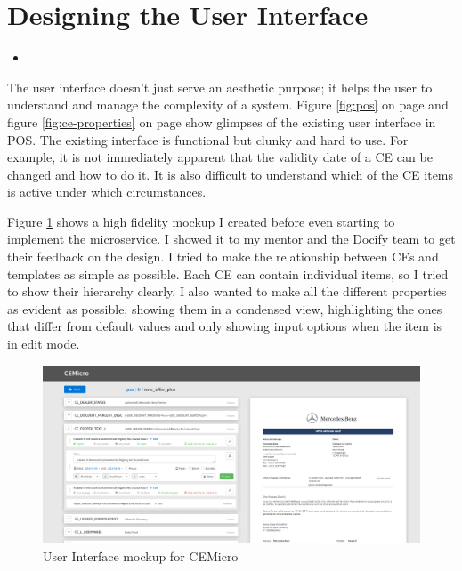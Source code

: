 \section{Designing the User Interface}

\begin{itemize}
  \item {}
\end{itemize}

The user interface doesn't just serve an aesthetic purpose; it helps the user to understand and manage the complexity of a system. Figure \ref{fig:pos} on page \pageref{fig:pos} and figure \ref{fig:ce-properties} on page \pageref{fig:ce-properties} show glimpses of the existing user interface in POS. The existing interface is functional but clunky and hard to use. For example, it is not immediately apparent that the validity date of a CE can be changed and how to do it. It is also difficult to understand which of the CE items is active under which circumstances.

Figure \ref{fig:mockup} shows a high fidelity mockup I created before even starting to implement the microservice. I showed it to my mentor and the Docify team to get their feedback on the design. I tried to make the relationship between CEs and templates as simple as possible. Each CE can contain individual items, so I tried to show their hierarchy clearly. I also wanted to make all the different properties as evident as possible, showing them in a condensed view, highlighting the ones that differ from default values and only showing input options when the item is in edit mode.

\begin{figure}
  \centering
  \includegraphics[width=\linewidth]{assets/cemicro-ui-mockup.png}
  \caption{User Interface mockup for CEMicro}
  \label{fig:mockup}
\end{figure}

